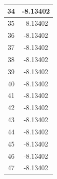 \documentclass[12pt,a4paper]{article}
\numberwithin{equation}{section}
\numberwithin{figure}{section}
\numberwithin{table}{section}
\begin{document}
\begin{longtable}{|c|c|}
34 & -8.13402 \\ \hline
35 & -8.13402 \\ \hline
36 & -8.13402 \\ \hline
37 & -8.13402 \\ \hline
38 & -8.13402 \\ \hline
39 & -8.13402 \\ \hline
40 & -8.13402 \\ \hline
41 & -8.13402 \\ \hline
42 & -8.13402 \\ \hline
43 & -8.13402 \\ \hline
44 & -8.13402 \\ \hline
45 & -8.13402 \\ \hline
46 & -8.13402 \\ \hline
47 & -8.13402 \\ \hline
	\end{longtable}
	
\end{document}
